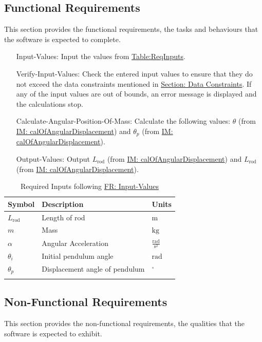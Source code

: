 \documentclass[12pt]{article}
\begin{document}
\subsection{Functional Requirements}
\label{Sec:FRs}
This section provides the functional requirements, the tasks and behaviours that the software is expected to complete.

\begin{itemize}
\item[Input-Values:\phantomsection\label{inputValues}]{Input the values from \hyperref[Table:ReqInputs]{Table:ReqInputs}.}
\item[Verify-Input-Values:\phantomsection\label{verifyInptVals}]{Check the entered input values to ensure that they do not exceed the data constraints mentioned in \hyperref[Sec:DataConstraints]{Section: Data Constraints}. If any of the input values are out of bounds, an error message is displayed and the calculations stop.}
\item[Calculate-Angular-Position-Of-Mass:\phantomsection\label{calcAngPos}]{Calculate the following values: $θ$ (from \hyperref[IM:calOfAngularDisplacement]{IM: calOfAngularDisplacement}) and ${θ_{p}}$ (from \hyperref[IM:calOfAngularDisplacement]{IM: calOfAngularDisplacement}).}
\item[Output-Values:\phantomsection\label{outputValues}]{Output ${L_{\text{rod}}}$ (from \hyperref[IM:calOfAngularDisplacement]{IM: calOfAngularDisplacement}) and ${L_{\text{rod}}}$ (from \hyperref[IM:calOfAngularDisplacement]{IM: calOfAngularDisplacement}).}
\end{itemize}
\begin{longtable}{l l l}
\toprule
\textbf{Symbol} & \textbf{Description} & \textbf{Units}
\\
\midrule
\endhead
${L_{\text{rod}}}$ & Length of rod & ${\text{m}}$
\\
$m$ & Mass & ${\text{kg}}$
\\
$α$ & Angular Acceleration & $\frac{\text{rad}}{\text{s}^{2}}$
\\
${θ_{i}}$ & Initial pendulum angle & ${\text{rad}}$
\\
${θ_{p}}$ & Displacement angle of pendulum & ${{}^{\circ}}$
\\
\bottomrule
\caption{Required Inputs following \hyperref[inputValues]{FR: Input-Values}}
\label{Table:ReqInputs}
\end{longtable}
\subsection{Non-Functional Requirements}
\label{Sec:NFRs}
This section provides the non-functional requirements, the qualities that the software is expected to exhibit.
\end{document}
